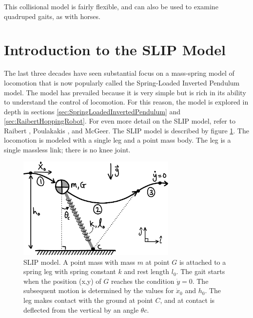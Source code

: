This collisional model is fairly flexible, and can also be used to examine quadruped gaits, as with horses.


\section{Introduction to the SLIP Model} %
\label{sec:SLIP}

The last three decades have seen substantial focus on a mass-spring model of locomotion that is now popularly called the Spring-Loaded Inverted Pendulum model. The model has prevailed because it is very simple but is rich in its ability to understand the control of locomotion.  For this reason, the model is explored in depth in sections \ref{sec:SpringLoadedInvertedPendulum} and \ref{sec:RaibertHoppingRobot}. For even more detail on the SLIP model, refer to Raibert \cite{raibert95}, Poulakakis \cite{poulakakis07,poulakakis07b}, and McGeer. The SLIP model is described by figure \ref{fig:SLIPSetup}. The locomotion is modeled with a single leg and a point mass body. The leg is a single massless link; there is no knee joint.

\begin{figure}[h]		%
\begin{centering}
\includegraphics[width=0.7\textwidth]{Figures/SLIPSetup}\par
\end{centering}
\caption[Diagram: SLIP Model]{SLIP model. A point mass with mass $m$ at point $G$ is attached to a spring leg with spring constant $k$ and rest length $l_{0}$.  The gait starts when the position (x,y) of $G$  reaches the condition $\dot{y} = 0$. The subsequent motion is determined by the values for $\dot{x}_{0}$ and $h_{0}$. The leg makes contact with the ground at point $C$, and at contact is deflected from the vertical by an angle $\theta{c}$.}
\label{fig:SLIPSetup}
\end{figure}
%

